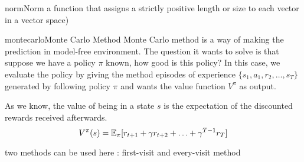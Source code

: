 \documentclass[9pt]{article}
\begin{document}
\begin{topic}{norm}{Norm}
a function that assigns  a strictly positive length or size to each vector in a vector space)
\end{topic}

\begin{topic}{montecarlo}{Monte Carlo Method}
Monte Carlo method is a way of making the prediction in model-free environment. The question it wants to solve is that suppose we have a policy $\pi$ known, how good is this policy? In this case, we evaluate the policy by giving the method episodes of experience $\{s_1,a_1,r_2,\ldots,s_T\}$ generated by following policy $\pi$ and wants the value function $V^{\pi}$ as output.

As we know, the value of being in a state $s$ is the expectation of the discounted rewards received afterwards. 
\[
V^{\pi}(s) = \operatorname{\mathbb{E}}_{\pi}[r_{t+1} + \gamma r_{t+2} + \ldots + \gamma^{T-1}r_T]
\]

two methods can be used here : first-visit and every-visit method
\end{topic}
\end{document}
